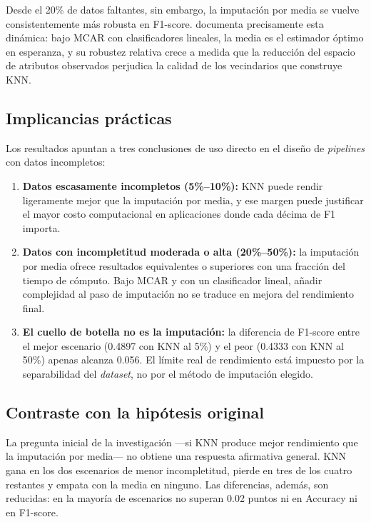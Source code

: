 Desde el 20\% de datos faltantes, sin embargo, la imputación por media
se vuelve consistentemente más robusta en F1-score. \textcite{vanbuuren2018}
documenta precisamente esta dinámica: bajo MCAR con clasificadores lineales,
la media es el estimador óptimo en esperanza, y su robustez relativa
crece a medida que la reducción del espacio de atributos observados
perjudica la calidad de los vecindarios que construye KNN.

\subsection{Implicancias prácticas}

Los resultados apuntan a tres conclusiones de uso directo en el diseño de
\textit{pipelines} con datos incompletos:

\begin{enumerate}
    \item \textbf{Datos escasamente incompletos (5\%--10\%):} KNN puede
          rendir ligeramente mejor que la imputación por media, y ese
          margen puede justificar el mayor costo computacional en
          aplicaciones donde cada décima de F1 importa.

    \item \textbf{Datos con incompletitud moderada o alta (20\%--50\%):}
          la imputación por media ofrece resultados equivalentes o
          superiores con una fracción del tiempo de cómputo. Bajo MCAR
          y con un clasificador lineal, añadir complejidad al paso de
          imputación no se traduce en mejora del rendimiento final.

    \item \textbf{El cuello de botella no es la imputación:} la diferencia
          de F1-score entre el mejor escenario (0.4897 con KNN al 5\%) y
          el peor (0.4333 con KNN al 50\%) apenas alcanza 0.056. El límite
          real de rendimiento está impuesto por la separabilidad del
          \textit{dataset}, no por el método de imputación elegido.
\end{enumerate}

\subsection{Contraste con la hipótesis original}

La pregunta inicial de la investigación —si KNN produce mejor rendimiento
que la imputación por media— no obtiene una respuesta afirmativa general.
KNN gana en los dos escenarios de menor incompletitud, pierde en tres de
los cuatro restantes y empata con la media en ninguno. Las diferencias,
además, son reducidas: en la mayoría de escenarios no superan 0.02 puntos
ni en Accuracy ni en F1-score.

